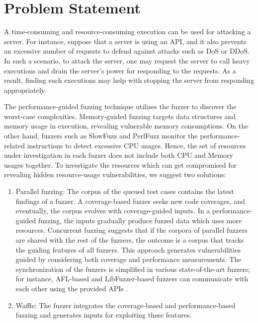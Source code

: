 \section{Problem Statement}

A time-consuming and resource-consuming execution can be used for attacking a server. For instance, suppose that a server is using an API, and it also prevents an excessive number of requests to defend against attacks such as DoS or DDoS. In such a scenario, to attack the server, one may request the server to call heavy executions and drain the server's power for responding to the requests. As a result, finding such executions may help with stopping the server from responding appropriately.

The performance-guided fuzzing technique utilizes the fuzzer to discover the worst-case complexities. Memory-guided fuzzing targets data structures and memory usage in execution, revealing vulnerable memory consumptions. On the other hand, fuzzers such as SlowFuzz and PerfFuzz monitor the performance-related instructions to detect excessive CPU usages. Hence, the set of resources under investigation in each fuzzer does not include both CPU and Memory usages together. To investigate the resources which can get compromised for revealing hidden resource-usage vulnerabilities, we suggest two solutions:

\begin{enumerate}
    \item Parallel fuzzing: The corpus of the queued test cases contains the latest findings of a fuzzer. A coverage-based fuzzer seeks new code coverages, and eventually, the corpus evolves with coverage-guided inputs. In a performance-guided fuzzing, the inputs gradually produce fuzzed data which uses more resources. Concurrent fuzzing suggests that if the corpora of parallel fuzzers are shared with the rest of the fuzzers, the outcome is a corpus that tracks the guiding features of all fuzzers. This approach generates vulnerabilities guided by considering both coverage and performance measurements. The synchronization of the fuzzers is simplified in various state-of-the-art fuzzers; for instance, AFL-based and LibFuzzer-based fuzzers can communicate with each other using the provided APIs \cite{afl_par}.
    
    \item Waffle: The fuzzer integrates the coverage-based and performance-based fuzzing and generates inputs for exploiting these features.
\end{enumerate}
